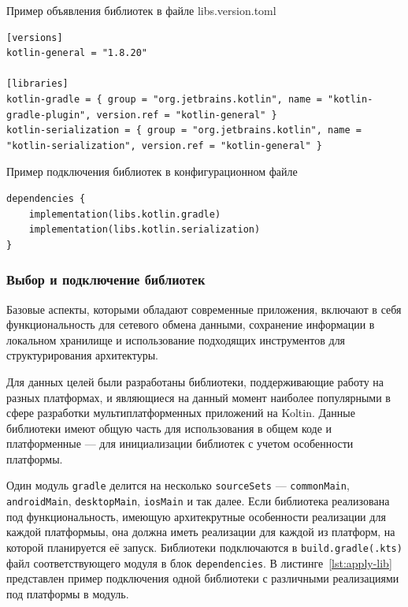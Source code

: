 \documentclass[14pt, russian]{scrartcl}
\begin{document}
\begin{listing}[!htb]
\caption{Пример объявления библиотек в файле libs.version.toml}
\label{lst:libs-version-toml}
\begin{verbatim}
[versions]
kotlin-general = "1.8.20"

[libraries]
kotlin-gradle = { group = "org.jetbrains.kotlin", name = "kotlin-gradle-plugin", version.ref = "kotlin-general" }
kotlin-serialization = { group = "org.jetbrains.kotlin", name = "kotlin-serialization", version.ref = "kotlin-general" }
\end{verbatim}
\end{listing}

\begin{listing}[!htb]
\caption{Пример подключения библиотек в конфигурационном файле}
\label{lst:gradle-kts}
\begin{verbatim}
dependencies {
    implementation(libs.kotlin.gradle)
    implementation(libs.kotlin.serialization)
}
\end{verbatim}
\end{listing}

\subsubsection{Выбор и подключение библиотек}\label{sect:libs}

Базовые аспекты, которыми обладают современные приложения, включают в себя функциональность для сетевого обмена данными, сохранение информации в локальном хранилище и использование подходящих инструментов для структурирования архитектуры.

Для данных целей были разработаны библиотеки, поддерживающие работу на разных платформах, и являющиеся на данный момент наиболее популярными в сфере разработки мультиплатформенных приложений на Koltin. Данные библиотеки имеют общую часть для использования в общем коде и платформенные --- для инициализации библиотек с учетом особенности платформы.

Один модуль \texttt{gradle} делится на несколько \texttt{sourceSets} --- \texttt{commonMain}, \texttt{androidMain}, \texttt{desktopMain}, \texttt{iosMain} и так далее. Если библиотека реализована под функциональность, имеющую архитекрутные особенности реализации для каждой платформыы, она должна иметь реализации для каждой из платформ, на которой планируется её запуск. Библиотеки подключаются в \texttt{build.gradle(.kts)} файл соответствующего модуля в блок \texttt{dependencies}. В листинге~\ref{lst:apply-lib} представлен пример подключения одной библиотеки с различными реализациями под платформы в модуль.
\end{document}
